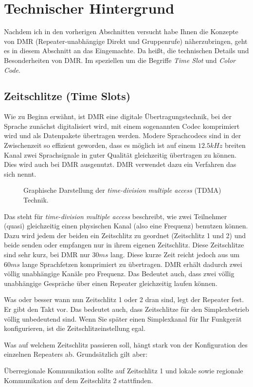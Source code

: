 \section{Technischer Hintergrund} \label{sec:technik}
Nachdem ich in den vorherigen Abschnitten versucht habe Ihnen die Konzepte von DMR (Repeater-unabhängige Direkt und Gruppenrufe) näherzubringen, geht es in diesem Abschnitt an das Eingemachte. Da heißt, die technischen Details und Besonderheiten von DMR. Im speziellen um die Begriffe \emph{Time Slot} und \emph{Color Code}.

\subsection{Zeitschlitze (Time Slots)}
Wie zu Beginn erwähnt, ist DMR eine digitale Übertragungstechnik, bei der Sprache zunächst digitalisiert wird, mit einem sogenannten Codec komprimiert wird und als Datenpakete übertragen werden. Modere Sprachcodecs sind in der Zwischenzeit so effizient geworden, dass es möglich ist auf einem $12.5 kHz$ breiten Kanal zwei Sprachsignale in guter Qualität gleichzeitig übertragen zu können. Dies wird auch bei DMR ausgenutzt. DMR verwendet dazu ein Verfahren das sich  nennt. 

\begin{figure}[!ht]
 \centering
 
 \caption{Graphische Darstellung der \emph{time-division multiple access} (TDMA) Technik.}
\end{figure}

Das steht für \emph{time-division multiple access} beschreibt, wie zwei Teilnehmer (quasi) gleichzeitig einen physischen Kanal (also eine Frequenz) benutzen können. Dazu wird jedem der beiden ein Zeitschlitz zu geordnet (Zeitschlitz 1 und 2) und beide senden oder empfangen nur in ihrem eigenen Zeitschlitz. Diese Zeitschlitze sind sehr kurz, bei DMR nur $30ms$ lang. Diese kurze Zeit reicht jedoch aus um $60ms$ lange Sprachfetzen komprimiert zu übertragen. DMR erhält dadurch zwei völlig unabhängige Kanäle pro Frequenz. Das Bedeutet auch, dass zwei völlig unabhängige Gespräche über einen Repeater gleichzeitig laufen können.

Was oder besser wann nun Zeitschlitz 1 oder 2 dran sind, legt der Repeater fest. Er gibt den Takt vor. Das bedeutet auch, dass Zeitschlitze für den Simplexbetrieb völlig unbedeutend sind. Wenn Sie später einen Simplexkanal für Ihr Funkgerät konfigurieren, ist die Zeitschlitzeinstellung egal.

Was auf welchem Zeitschlitz passieren soll, hängt stark von der Konfiguration des einzelnen Repeaters ab. Grundsätzlich gilt aber:
\begin{merke}
 Überregionale Kommunikation sollte auf Zeitschlitz 1 und lokale sowie regionale Kommunikation auf dem Zeitschlitz 2 stattfinden.
\end{merke} 

